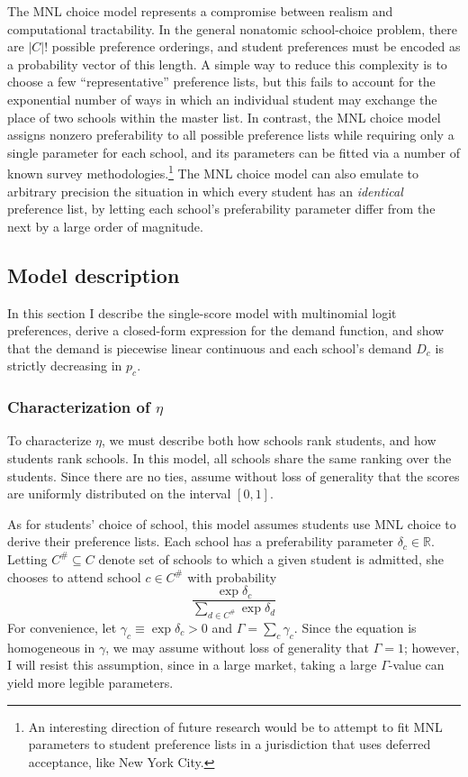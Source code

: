 \documentclass[12pt]{article}
\theoremstyle{definition}
\begin{document}
The MNL choice model represents a compromise between realism and computational tractability. In the general nonatomic school-choice problem, there are $|C|!$ possible preference orderings, and student preferences must be encoded as a probability vector of this length. A simple way to reduce this complexity is to choose a few ``representative'' preference lists, but this fails to account for the exponential number of ways in which an individual student may exchange the place of two schools within the master list. In contrast, the MNL choice model assigns nonzero preferability to all possible preference lists while requiring only a single parameter for each school, and its parameters can be fitted via a number of known survey methodologies.\footnote{An interesting direction of future research would be to attempt to fit MNL parameters to student preference lists in a jurisdiction that uses deferred acceptance, like New York City.} The MNL choice model can also emulate to arbitrary precision the situation in which every student has an \emph{identical} preference list, by letting each school's preferability parameter differ from the next by a large order of magnitude. 


\subsection{Model description} 

In this section I describe the single-score model with multinomial logit preferences, derive a closed-form expression for the demand function, and show that the demand is piecewise linear continuous and each school's demand $D_c$ is strictly decreasing in $p_c$. 

\subsubsection{Characterization of $\eta$}
To characterize $\eta$, we must describe both how schools rank students, and how students rank schools. In this model, all schools share the same ranking over the students. Since there are no ties, assume without loss of generality that the scores are uniformly distributed on the interval $[0,1]$. 

As for students' choice of school, this model assumes students use MNL choice to derive their preference lists. Each school has a preferability parameter $\delta_c \in \mathbb{R}$. Letting $C^\# \subseteq C$ denote set of schools to which a given student is admitted, she chooses to attend school $c \in C^\#$ with probability
\[\frac{\exp \delta_c}{\sum_{d \in C^\#} \exp \delta_d}\]
For convenience, let $\gamma_c \equiv \exp \delta_c > 0$ and $\Gamma = \sum_c \gamma_c$. Since the equation is homogeneous in $\gamma$, we may assume without loss of generality that $\Gamma = 1$; however, I will resist this assumption, since in a large market, taking a large $\Gamma$-value can yield more legible parameters. 
\end{document}
